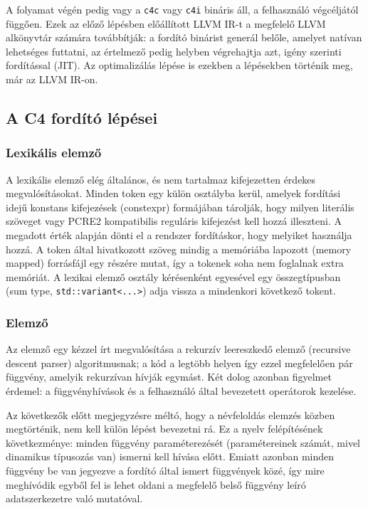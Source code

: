 A folyamat végén pedig vagy a {\tt c4c} vagy {\tt c4i} bináris áll, a felhasználó végcéljától függően.
Ezek az előző lépésben előállított LLVM \gls{IR}-t a megfelelő LLVM alkönyvtár számára továbbítják: a fordító binárist generál belőle, amelyet natívan lehetséges futtatni, az értelmező pedig helyben végrehajtja azt, igény szerinti fordítással (\gls{JIT}).
Az optimalizálás lépése is ezekben a lépésekben történik meg, már az LLVM \gls{IR}-on.

\subsection{A C4 fordító lépései}\label{subsec:c4:impl:steps}

\subsubsection{Lexikális elemző}

A lexikális elemző elég általános, és nem tartalmaz kifejezetten érdekes megvalósításokat.
Minden token egy külön osztályba kerül, amelyek fordítási idejű konstans kifejezések (constexpr) formájában tárolják, hogy milyen literális szöveget vagy PCRE2 kompatibilis reguláris kifejezést kell hozzá illeszteni.
A megadott érték alapján dönti el a rendszer fordításkor, hogy melyiket használja hozzá.
A token által hivatkozott szöveg mindig a memóriába lapozott (memory mapped) forrásfájl egy részére mutat, így a tokenek soha nem foglalnak extra memóriát.
A lexikai elemző osztály kérésenként egyesével egy összegtípusban (sum type, {\tt std::variant<...>}) adja vissza a mindenkori következő tokent.

\subsubsection{Elemző}

Az elemző egy kézzel írt megvalósítása a rekurzív leereszkedő elemző (recursive descent parser) algoritmusnak; a kód a legtöbb helyen így ezzel megfelelően pár függvény, amelyik rekurzívan hívják egymást.
Két dolog azonban figyelmet érdemel: a függvényhívások és a felhasználó által bevezetett operátorok kezelése.

Az következők előtt megjegyzésre méltó, hogy a névfeloldás elemzés közben megtörténik, nem kell külön lépést bevezetni rá.
Ez a nyelv felépítésének következménye: minden függvény paraméterezését (paramétereinek számát, mivel dinamikus típusozás van) ismerni kell hívása előtt.
Emiatt azonban minden függvény be van jegyezve a fordító által ismert függvények közé, így mire meghívódik egyből fel is lehet oldani a megfelelő belső függvény leíró adatszerkezetre való mutatóval.

